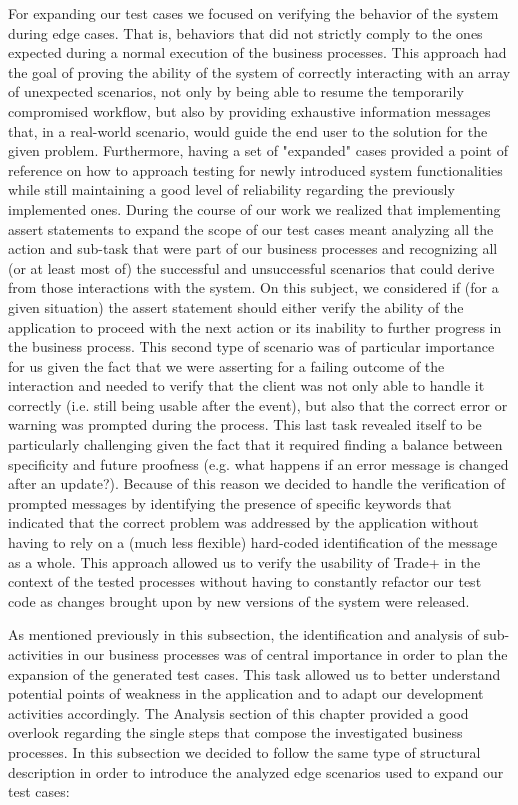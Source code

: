 For expanding our test cases we focused on verifying the behavior of the system during edge cases. That is, behaviors that did not strictly comply to the ones expected during a normal execution of the business processes. This approach had the goal of proving the ability of the system of correctly interacting with an array of unexpected scenarios, not only by being able to resume the temporarily compromised workflow, but also by providing exhaustive information messages that, in a real-world scenario, would guide the end user to the solution for the given problem. Furthermore, having a set of "expanded" cases provided a point of reference on how to approach testing for newly introduced system functionalities while still maintaining a good level of reliability regarding the previously implemented ones. During the course of our work we realized that implementing assert statements to expand the scope of our test cases meant analyzing all the action and sub-task that were part of our business processes and recognizing all (or at least most of) the successful and unsuccessful scenarios that could derive from those interactions with the system. On this subject, we considered if (for a given situation) the assert statement should either verify the ability of the application to proceed with the next action or its inability to further progress in the business process. This second type of scenario was of particular importance for us given the fact that we were asserting for a failing outcome of the interaction and needed to verify that the client was not only able to handle it correctly (i.e. still being usable after the event), but also that the correct error or warning was prompted during the process. This last task revealed itself to be particularly challenging given the fact that it required finding a balance between specificity and future proofness (e.g. what happens if an error message is changed after an update?). Because of this reason we decided to handle the verification of prompted messages by identifying the presence of specific keywords that indicated that the correct problem was addressed by the application without having to rely on a (much less flexible) hard-coded identification of the message as a whole. This approach allowed us to verify the usability of Trade+ in the context of the tested processes without having to constantly refactor our test code as changes brought upon by new versions of the system were released.

As mentioned previously in this subsection, the identification and analysis of sub-activities in our business processes was of central importance in order to plan the expansion of the generated test cases. This task allowed us to better understand potential points of weakness in the application and to adapt our development activities accordingly. The Analysis section of this chapter provided a good overlook regarding the single steps that compose the investigated business processes. In this subsection we decided to follow the same type of structural description in order to introduce the analyzed edge scenarios used to expand our test cases:

